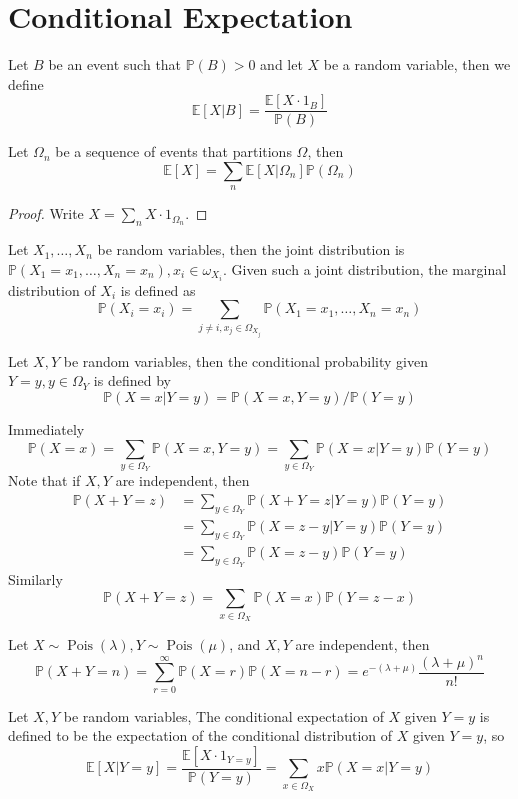 \section{Conditional Expectation}
\begin{definition}
    Let $B$ be an event such that $\mathbb P(B)>0$ and let $X$ be a random variable, then we define
    $$\mathbb E[X|B]=\frac{\mathbb E[X\cdot 1_B]}{\mathbb P(B)}$$
\end{definition}
\begin{proposition}
    Let $\Omega_n$ be a sequence of events that partitions $\Omega$, then
    $$\mathbb E[X]=\sum_n\mathbb E[X|\Omega_n]\mathbb P(\Omega_n)$$
\end{proposition}
\begin{proof}
    Write $X=\sum_nX\cdot1_{\Omega_n}$.
\end{proof}
\begin{definition}
    Let $X_1,\ldots,X_n$ be random variables, then the joint distribution is $\mathbb P(X_1=x_1,\ldots,X_n=x_n),x_i\in\omega_{X_i}$.
    Given such a joint distribution, the marginal distribution of $X_i$ is defined as
    $$\mathbb P(X_i=x_i)=\sum_{j\neq i,x_j\in\Omega_{X_j}}\mathbb P(X_1=x_1,\ldots,X_n=x_n)$$
\end{definition}
\begin{definition}
    Let $X,Y$ be random variables, then the conditional probability given $Y=y,y\in\Omega_Y$ is defined by
    $$\mathbb P(X=x|Y=y)=\mathbb P(X=x,Y=y)/\mathbb P(Y=y)$$
\end{definition}
Immediately
$$\mathbb P(X=x)=\sum_{y\in\Omega_Y}\mathbb P(X=x,Y=y)=\sum_{y\in\Omega_Y}\mathbb P(X=x|Y=y)\mathbb P(Y=y)$$
Note that if $X,Y$ are independent, then
\begin{align*}
    \mathbb P(X+Y=z)&=\sum_{y\in\Omega_Y}\mathbb P(X+Y=z|Y=y)\mathbb P(Y=y)\\
    &=\sum_{y\in\Omega_Y}\mathbb P(X=z-y|Y=y)\mathbb P(Y=y)\\
    &=\sum_{y\in\Omega_Y}\mathbb P(X=z-y)\mathbb P(Y=y)
\end{align*}
Similarly
$$\mathbb P(X+Y=z)=\sum_{x\in\Omega_X}\mathbb P(X=x)\mathbb P(Y=z-x)$$
\begin{example}
    Let $X\sim\operatorname{Pois}(\lambda),Y\sim\operatorname{Pois}(\mu)$, and $X,Y$ are independent, then
    $$\mathbb P(X+Y=n)=\sum_{r=0}^\infty \mathbb P(X=r)\mathbb P(X=n-r)=e^{-(\lambda+\mu)}\frac{(\lambda+\mu)^n}{n!}$$
\end{example}
\begin{definition}
    Let $X,Y$ be random variables,
    The conditional expectation of $X$ given $Y=y$ is defined to be the expectation of the conditional distribution of $X$ given $Y=y$, so
    $$\mathbb E[X|Y=y]=\frac{\mathbb E[X\cdot 1_{Y=y}]}{\mathbb P(Y=y)}=\sum_{x\in\Omega_X}x\mathbb P(X=x|Y=y)$$
\end{definition}
